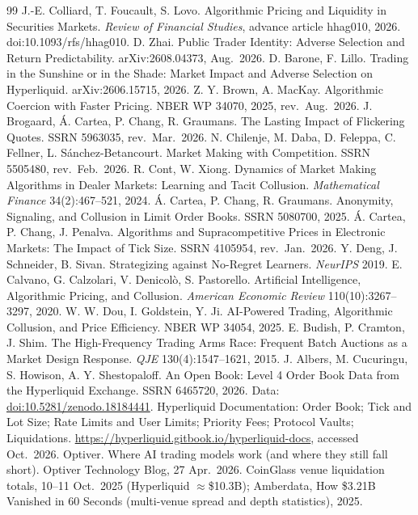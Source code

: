 \documentclass[11pt]{article}
\begin{document}
\begin{thebibliography}{99}\small
{} J.-E. Colliard, T. Foucault, S. Lovo. Algorithmic Pricing and Liquidity in Securities Markets. \emph{Review of Financial Studies}, advance article hhag010, 2026. doi:10.1093/rfs/hhag010.
 D. Zhai. Public Trader Identity: Adverse Selection and Return Predictability. arXiv:2608.04373, Aug.\ 2026.
 D. Barone, F. Lillo. Trading in the Sunshine or in the Shade: Market Impact and Adverse Selection on Hyperliquid. arXiv:2606.15715, 2026.
 Z. Y. Brown, A. MacKay. Algorithmic Coercion with Faster Pricing. NBER WP 34070, 2025, rev.\ Aug.\ 2026.
 J. Brogaard, \'A. Cartea, P. Chang, R. Graumans. The Lasting Impact of Flickering Quotes. SSRN 5963035, rev.\ Mar.\ 2026.
 N. Chilenje, M. Daba, D. Feleppa, C. Fellner, L. S\'anchez-Betancourt. Market Making with Competition. SSRN 5505480, rev.\ Feb.\ 2026.
 R. Cont, W. Xiong. Dynamics of Market Making Algorithms in Dealer Markets: Learning and Tacit Collusion. \emph{Mathematical Finance} 34(2):467--521, 2024.
 \'A. Cartea, P. Chang, R. Graumans. Anonymity, Signaling, and Collusion in Limit Order Books. SSRN 5080700, 2025.
 \'A. Cartea, P. Chang, J. Penalva. Algorithms and Supracompetitive Prices in Electronic Markets: The Impact of Tick Size. SSRN 4105954, rev.\ Jan.\ 2026.
 Y. Deng, J. Schneider, B. Sivan. Strategizing against No-Regret Learners. \emph{NeurIPS} 2019.
 E. Calvano, G. Calzolari, V. Denicol\`o, S. Pastorello. Artificial Intelligence, Algorithmic Pricing, and Collusion. \emph{American Economic Review} 110(10):3267--3297, 2020.
 W. W. Dou, I. Goldstein, Y. Ji. AI-Powered Trading, Algorithmic Collusion, and Price Efficiency. NBER WP 34054, 2025.
 E. Budish, P. Cramton, J. Shim. The High-Frequency Trading Arms Race: Frequent Batch Auctions as a Market Design Response. \emph{QJE} 130(4):1547--1621, 2015.
 J. Albers, M. Cucuringu, S. Howison, A. Y. Shestopaloff. An Open Book: Level 4 Order Book Data from the Hyperliquid Exchange. SSRN 6465720, 2026. Data: \href{https://doi.org/10.5281/zenodo.18184441}{doi:10.5281/zenodo.18184441}.
 Hyperliquid Documentation: Order Book; Tick and Lot Size; Rate Limits and User Limits; Priority Fees; Protocol Vaults; Liquidations. \url{https://hyperliquid.gitbook.io/hyperliquid-docs}, accessed Oct.\ 2026.
 Optiver. Where AI trading models work (and where they still fall short). Optiver Technology Blog, 27 Apr.\ 2026.
 CoinGlass venue liquidation totals, 10--11 Oct.\ 2025 (Hyperliquid $\approx$\$10.3B); Amberdata, How \$3.21B Vanished in 60 Seconds (multi-venue spread and depth statistics), 2025.
\end{thebibliography}
\end{document}
